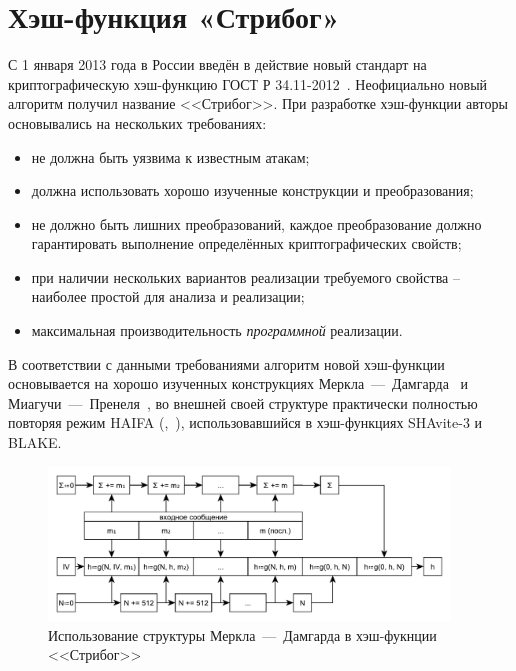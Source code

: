 \section{Хэш-функция «Стрибог»}\label{section-stribog}

С 1 января 2013 года в России введён в действие новый стандарт на криптографическую хэш-функцию ГОСТ Р 34.11-2012~\cite{GOST-R:34.11-2012}. Неофициально новый алгоритм получил название <<Стрибог>>. При разработке хэш-функции авторы основывались на нескольких требованиях:

\begin{itemize}
	\item не должна быть уязвима к известным атакам;
	\item должна использовать хорошо изученные конструкции и преобразования;
	\item не должно быть лишних преобразований, каждое преобразование должно гарантировать выполнение определённых криптографических свойств;
	\item при наличии нескольких вариантов реализации требуемого свойства -- наиболее простой для анализа и реализации;
	\item максимальная производительность \emph{программной} реализации.
\end{itemize}

В соответствии с данными требованиями алгоритм новой хэш-функции основывается на хорошо изученных конструкциях Меркла~---~Дамгарда~\cite{Merkle:1979, Merkle:1990, Damgard:1990} и Миагучи~---~Пренеля~\cite{Espen:Mieghem:1989, Miyaguchi:Ohta:Iwata:1990:03, Miyaguchi:Ohta:Iwata:1990:11}, во внешней своей структуре практически полностью повторяя режим HAIFA (,~\cite{Biham:Dunkelman:2007}), использовавшийся в хэш-функциях SHAvite-3 и BLAKE.

\begin{figure}[htb]
	\centering
	\includegraphics[width=0.95\textwidth]{pic/stribog-md}
  \caption{Использование структуры Меркла~---~Дамгарда в хэш-фукнции <<Стрибог>>}
  \label{fig:stribog-md}
\end{figure}


